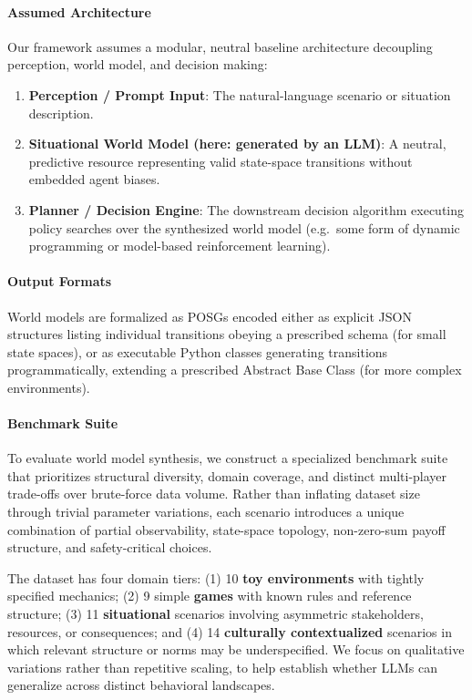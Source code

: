 \documentclass{article}
\begin{document}
\paragraph{Assumed Architecture}
Our framework assumes a modular, neutral baseline architecture decoupling perception, world model, and decision making:
\begin{enumerate}
    \item \textbf{Perception / Prompt Input}: The natural-language scenario or situation description.
    \item \textbf{Situational World Model (here: generated by an LLM)}: A neutral, predictive resource representing valid state-space transitions without embedded agent biases.
    \item \textbf{Planner / Decision Engine}: The downstream decision algorithm executing policy searches over the synthesized world model (e.g.\ some form of dynamic programming or model-based reinforcement learning).
\end{enumerate}

\paragraph{Output Formats}
World models are formalized as POSGs encoded either as explicit JSON structures listing individual transitions obeying a prescribed schema (for small state spaces), or as executable Python classes generating transitions programmatically, extending a prescribed Abstract Base Class (for more complex environments).

\paragraph{Benchmark Suite}
\label{sec:dataset}

To evaluate world model synthesis, we construct a specialized benchmark suite that prioritizes structural diversity, domain coverage, and distinct multi-player trade-offs over brute-force data volume. Rather than inflating dataset size through trivial parameter variations, each scenario introduces a unique combination of partial observability, state-space topology, non-zero-sum payoff structure, and safety-critical choices.

The dataset has four domain tiers: (1) 10 \textbf{toy environments} with tightly specified mechanics; (2) 9 simple \textbf{games} with known rules and reference structure; (3) 11 \textbf{situational} scenarios involving asymmetric stakeholders, resources, or consequences; and (4) 14 \textbf{culturally contextualized} scenarios in which relevant structure or norms may be underspecified. We focus on qualitative variations rather than repetitive scaling, to help establish whether LLMs can generalize across distinct behavioral landscapes.
\end{document}
